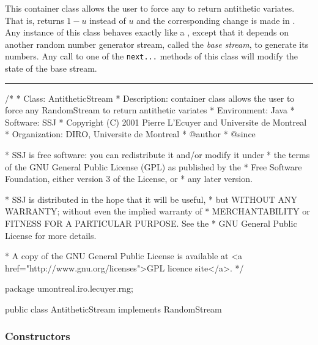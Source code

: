 
This container class allows the user to force any  to 
return antithetic variates.  That is,  returns 
$1-u$ instead of $u$ and the corresponding change is made in 
.
Any instance of this class behaves exactly like a ,
except that it depends on another random number generator stream, called the
\emph{base stream}, to generate its numbers. 
Any call to one of the \texttt{next...}
methods of this class will modify the state of the base stream. 


\bigskip\hrule

\begin{code}
\begin{hide}
/*
 * Class:        AntitheticStream
 * Description:  container class allows the user to force any RandomStream
                 to return antithetic variates
 * Environment:  Java
 * Software:     SSJ 
 * Copyright (C) 2001  Pierre L'Ecuyer and Universite de Montreal
 * Organization: DIRO, Universite de Montreal
 * @author       
 * @since

 * SSJ is free software: you can redistribute it and/or modify it under
 * the terms of the GNU General Public License (GPL) as published by the
 * Free Software Foundation, either version 3 of the License, or
 * any later version.

 * SSJ is distributed in the hope that it will be useful,
 * but WITHOUT ANY WARRANTY; without even the implied warranty of
 * MERCHANTABILITY or FITNESS FOR A PARTICULAR PURPOSE.  See the
 * GNU General Public License for more details.

 * A copy of the GNU General Public License is available at
   <a href="http://www.gnu.org/licenses">GPL licence site</a>.
 */
\end{hide}
package umontreal.iro.lecuyer.rng; 

public class AntitheticStream implements RandomStream \begin{hide} {

   // The base stream.
   private RandomStream st;

\end{hide}
\end{code}

\subsubsection* {Constructors}

